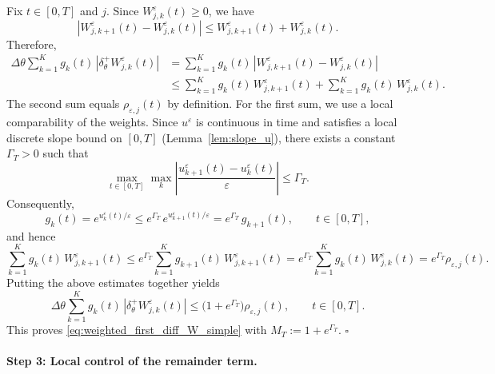 \documentclass[11pt, dina4, amsfont12]{article}
\begin{document}
Fix $t\in[0,T]$ and $j$. Since $W_{j,k}^\varepsilon(t)\ge0$, we have
\[
|W_{j,k+1}^\varepsilon(t)-W_{j,k}^\varepsilon(t)|
\le
W_{j,k+1}^\varepsilon(t)+W_{j,k}^\varepsilon(t).
\]
Therefore,
\begin{align*}
\Delta\theta\sum_{k=1}^K g_k(t)\,|\delta_\theta^+ W_{j,k}^\varepsilon(t)|
&=
\sum_{k=1}^K g_k(t)\,|W_{j,k+1}^\varepsilon(t)-W_{j,k}^\varepsilon(t)| \\
&\le
\sum_{k=1}^K g_k(t)\,W_{j,k+1}^\varepsilon(t)
+
\sum_{k=1}^K g_k(t)\,W_{j,k}^\varepsilon(t).
\end{align*}
The second sum equals $\rho_{\varepsilon,j}(t)$ by definition.  
For the first sum, we use a local comparability of the weights.
Since $u^\varepsilon$ is continuous in time and satisfies a local discrete slope
bound on $[0,T]$ (Lemma~\ref{lem:slope_u}), there exists a constant $\Gamma_T>0$
such that
\begin{equation}\label{eq:weight_ratio_pf}
\max_{t\in[0,T]}\max_k
\left|\frac{u_{k+1}^\varepsilon(t)-u_k^\varepsilon(t)}{\varepsilon}\right|
\le \Gamma_T .
\end{equation}
Consequently,
\[
g_k(t)=e^{u_k^\varepsilon(t)/\varepsilon}
\le
e^{\Gamma_T}\,e^{u_{k+1}^\varepsilon(t)/\varepsilon}
=
e^{\Gamma_T}\,g_{k+1}(t),
\qquad t\in[0,T],
\]
and hence
\[
\sum_{k=1}^K g_k(t)\,W_{j,k+1}^\varepsilon(t)
\le
e^{\Gamma_T}\sum_{k=1}^K g_{k+1}(t)\,W_{j,k+1}^\varepsilon(t)
=
e^{\Gamma_T}\sum_{k=1}^K g_k(t)\,W_{j,k}^\varepsilon(t)
=
e^{\Gamma_T}\rho_{\varepsilon,j}(t).
\]
Putting the above estimates together yields
\[
\Delta\theta\sum_{k=1}^K g_k(t)\,|\delta_\theta^+ W_{j,k}^\varepsilon(t)|
\le
\bigl(1+e^{\Gamma_T}\bigr)\rho_{\varepsilon,j}(t),
\qquad t\in[0,T].
\]
This proves \eqref{eq:weighted_first_diff_W_simple} with
$M_T:=1+e^{\Gamma_T}$.
\hfill$\square$





\paragraph{Step 3: Local control of the remainder term.}
\end{document}
